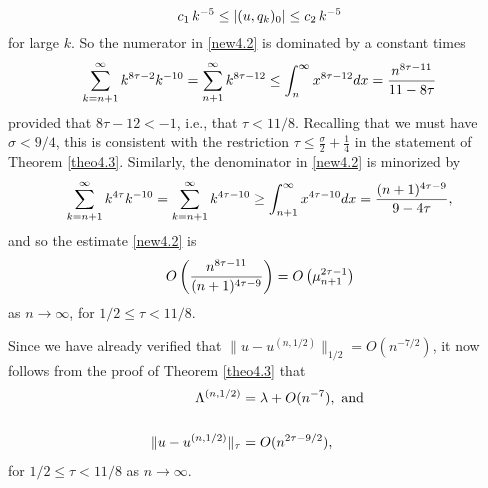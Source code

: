 \documentclass[final]{siamltex}
\numberwithin{equation}{section}
\begin{document}
\begin{equation} \notag
c_1 \, k^{-5} \le |(u, q_k)_0| \le c_2 \, k^{-5}
\end{equation}
for large $k$. So the numerator in \eqref{new4.2} is dominated by a constant times
\begin{equation} \notag
\sum_{k=n+1}^{\infty} k^{8 \tau-2} k^{-10} = \sum_{n+1}^{\infty} k^{8 \tau -12} \le \int_{n}^{\infty} x^{8 \tau-12} dx= \frac{n^{8 \tau-11}}{11-8 \tau}
\end{equation}
provided that $8 \tau-12<-1$, i.e., that $\tau<11/8$. Recalling that we must have $\sigma <9/4$, this is consistent with the restriction $\tau\le \frac{\sigma}{2}+\frac{1}{4}$ in the statement of Theorem \ref{theo4.3}. Similarly, the denominator in \eqref{new4.2} is minorized by
\begin{equation} \notag
\sum_{k=n+1}^{\infty} k^{4 \tau} k^{-10} = \sum_{k=n+1}^{\infty} k^{4 \tau-10}
\ge \int_{n+1}^{\infty} x^{4 \tau-10} dx= \frac{(n+1)^{4 \tau-9}}{9 -4 \tau},
\end{equation}
and so the estimate \eqref{new4.2} is
\begin{equation} \notag O\left(\frac{n^{8 \tau-11}}{(n+1)^{4 \tau-9}}\right)=O\left(\mu_{n+1}^{2 \tau-1}
\right)
\end{equation} as $n \to \infty$, for $1/2 \le \tau <11/8$.

Since we have already verified that $\|u- u^{(n,1/2)}\|_{1/2}=O(n^{-7/2})$, it now follows from the proof of Theorem \ref{theo4.3} that
\begin{align} \label{new5.5}
\Lambda^{(n,1/2)}&= \lambda+O(n^{-7}), \text{ and } \notag \\
\\
\|u-u^{(n,1/2)}\|_{\tau}&= O(n^{2 \tau-9/2}),\notag
\end{align}
for $1/2 \le \tau <11/8$ as $n\to \infty$.
\end{document}

